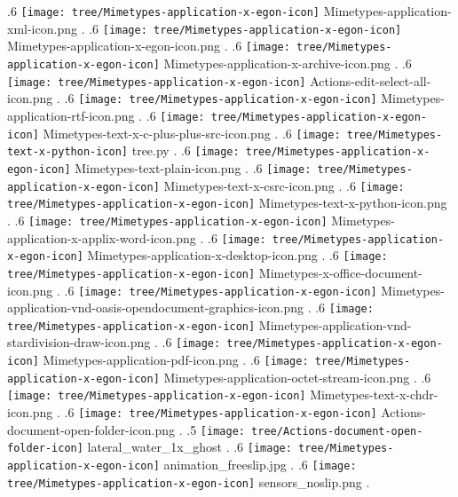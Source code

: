 {.6 { \texttt{[image: tree/Mimetypes-application-x-egon-icon]} Mimetypes-application-xml-icon.png }.
.6 { \texttt{[image: tree/Mimetypes-application-x-egon-icon]} Mimetypes-application-x-egon-icon.png }.
.6 { \texttt{[image: tree/Mimetypes-application-x-egon-icon]} Mimetypes-application-x-archive-icon.png }.
.6 { \texttt{[image: tree/Mimetypes-application-x-egon-icon]} Actions-edit-select-all-icon.png }.
.6 { \texttt{[image: tree/Mimetypes-application-x-egon-icon]} Mimetypes-application-rtf-icon.png }.
.6 { \texttt{[image: tree/Mimetypes-application-x-egon-icon]} Mimetypes-text-x-c-plus-plus-src-icon.png }.
.6 { \texttt{[image: tree/Mimetypes-text-x-python-icon]} tree.py }.
.6 { \texttt{[image: tree/Mimetypes-application-x-egon-icon]} Mimetypes-text-plain-icon.png }.
.6 { \texttt{[image: tree/Mimetypes-application-x-egon-icon]} Mimetypes-text-x-csrc-icon.png }.
.6 { \texttt{[image: tree/Mimetypes-application-x-egon-icon]} Mimetypes-text-x-python-icon.png }.
.6 { \texttt{[image: tree/Mimetypes-application-x-egon-icon]} Mimetypes-application-x-applix-word-icon.png }.
.6 { \texttt{[image: tree/Mimetypes-application-x-egon-icon]} Mimetypes-application-x-desktop-icon.png }.
.6 { \texttt{[image: tree/Mimetypes-application-x-egon-icon]} Mimetypes-x-office-document-icon.png }.
.6 { \texttt{[image: tree/Mimetypes-application-x-egon-icon]} Mimetypes-application-vnd-oasis-opendocument-graphics-icon.png }.
.6 { \texttt{[image: tree/Mimetypes-application-x-egon-icon]} Mimetypes-application-vnd-stardivision-draw-icon.png }.
.6 { \texttt{[image: tree/Mimetypes-application-x-egon-icon]} Mimetypes-application-pdf-icon.png }.
.6 { \texttt{[image: tree/Mimetypes-application-x-egon-icon]} Mimetypes-application-octet-stream-icon.png }.
.6 { \texttt{[image: tree/Mimetypes-application-x-egon-icon]} Mimetypes-text-x-chdr-icon.png }.
.6 { \texttt{[image: tree/Mimetypes-application-x-egon-icon]} Actions-document-open-folder-icon.png }.
.5 { \texttt{[image: tree/Actions-document-open-folder-icon]} lateral\_water\_1x\_ghost }.
.6 { \texttt{[image: tree/Mimetypes-application-x-egon-icon]} animation\_freeslip.jpg }.
.6 { \texttt{[image: tree/Mimetypes-application-x-egon-icon]} sensors\_noslip.png }.
}
